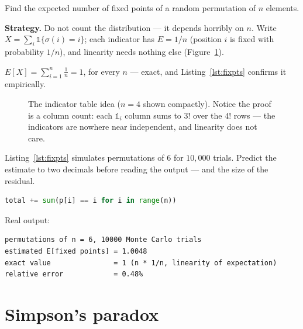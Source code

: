 \begin{example}\label{ex:fixpts}
Find the expected number of fixed points of a random permutation of
$n$ elements.
\par\smallskip
\textbf{Strategy.} Do not count the distribution --- it depends
horribly on $n$. Write $X = \sum_i \mathbb{1}\{\sigma(i) = i\}$;
each indicator has $E = 1/n$ (position $i$ is fixed with probability
$1/n$), and linearity needs nothing else (Figure~\ref{fig:indicator}).
\par\smallskip
\begin{solution}
$E[X] = \sum_{i=1}^{n} \frac{1}{n} = 1$, for every $n$ --- exact, and
Listing~\ref{lst:fixpts} confirms it empirically.
\end{solution}
\end{example}

\begin{figure}[ht]\centering

\caption{The indicator table idea ($n = 4$ shown compactly). Notice the
proof is a column count: each $\mathbb{1}_i$ column sums to $3!$ over
the $4!$ rows --- the indicators are nowhere near independent, and
linearity does not care.}
\label{fig:indicator}
\end{figure}

\begin{checkpoint}
Listing~\ref{lst:fixpts} simulates permutations of $6$ for $10{,}000$
trials. Predict the estimate to two decimals before reading the output
--- and the size of the residual.
\end{checkpoint}

\begin{lstlisting}[language=Python,caption={\texttt{fixed\_points.py}:
Monte Carlo vs exact theory (script in
\texttt{code/fixed\_points.py}).},label={lst:fixpts}]
total += sum(p[i] == i for i in range(n))
\end{lstlisting}
Real output:
\begin{lstlisting}[numbers=none]
permutations of n = 6, 10000 Monte Carlo trials
estimated E[fixed points] = 1.0048
exact value               = 1 (n * 1/n, linearity of expectation)
relative error            = 0.48%
\end{lstlisting}

\section{Simpson's paradox}\label{sec:simpson}

